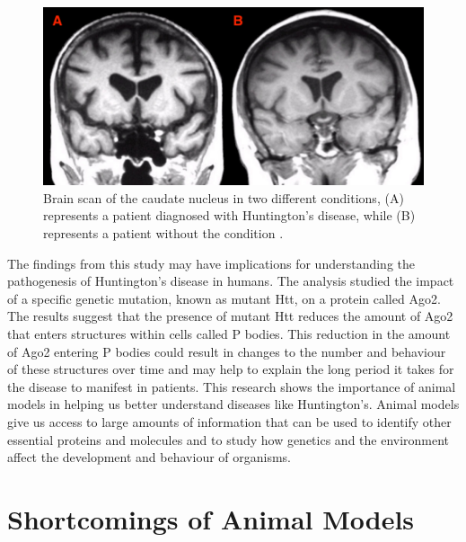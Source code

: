 \documentclass[10pt]{article}
\begin{document}
\begin{sloppypar}
  \begin{figure}[ht]
    \centering
    \includegraphics[width=\textwidth]{figures/huntington.jpg}
    \caption[Brain scan of the caudate nucleus in two different conditions, (A) represents a patient diagnosed with Huntington’s disease, while (B) represents a patient without the condition]{Brain scan of the caudate nucleus in two different conditions, (A) represents a patient diagnosed with Huntington’s disease, while (B) represents a patient without the condition \citep{c_preston_huntingtons_nodate}.}
    \label{fig:huntingtons}
  \end{figure}

  The findings from this study may have implications for understanding the pathogenesis of Huntington’s disease in humans. The analysis studied the impact of a specific genetic mutation, known as mutant Htt, on a protein called Ago2. The results suggest that the presence of mutant Htt reduces the amount of Ago2 that enters structures within cells called P bodies. This reduction in the amount of Ago2 entering P bodies could result in changes to the number and behaviour of these structures over time and may help to explain the long period it takes for the disease to manifest in patients. This research shows the importance of animal models in helping us better understand diseases like Huntington’s. Animal models give us access to large amounts of information that can be used to identify other essential proteins and molecules and to study how genetics and the environment affect the development and behaviour of organisms.

  \section{Shortcomings of Animal Models}
  \label{sec:shortcomings}


\end{sloppypar}
\end{document}
